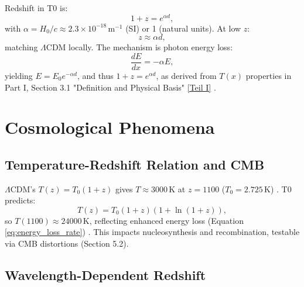 \documentclass[12pt,a4paper]{article}
\newcommand{\Tfield}{T(x)}
\begin{document}
	Redshift in T0 is:
	\begin{equation}
		1 + z = e^{\alpha d},
		\label{eq:redshift_distance}
	\end{equation}
	with \(\alpha = H_0 / c \approx 2.3 \times 10^{-18} \, \text{m}^{-1}\) (SI) or 1 (natural units). At low \(z\):
	\begin{equation}
		z \approx \alpha d,
		\label{eq:hubble_approx}
	\end{equation}
	matching \(\Lambda\)CDM locally. The mechanism is photon energy loss:
	\begin{equation}
		\frac{dE}{dx} = -\alpha E,
		\label{eq:energy_loss_rate}
	\end{equation}
	yielding \(E = E_0 e^{-\alpha d}\), and thus \(1 + z = e^{\alpha d}\), as derived from \(\Tfield\) properties in Part I, Section 3.1 "Definition and Physical Basis" \href{https://github.com/jpascher/T0-Time-Mass-Duality/tree/main/2/pdf/English/Bridging Quantum Mechanics and Relativity through Time-Mass Duality Part I Theoretical Foundations_en.pdf}{[Teil I]} \cite{pascher_messdifferenzen_2025}.
	
	\section{Cosmological Phenomena}
	\label{sec:cosmological_phenomena}
	
	\subsection{Temperature-Redshift Relation and CMB}
	\label{subsec:cmb_temp}
	
	\(\Lambda\)CDM’s \(T(z) = T_0 (1 + z)\) gives \(T \approx 3000 \, \text{K}\) at \(z = 1100\) (\(T_0 = 2.725 \, \text{K}\)) \cite{Fixsen2009}. T0 predicts:
	\begin{equation}
		T(z) = T_0 (1 + z) (1 + \ln(1 + z)),
		\label{eq:temperature_redshift_simplified}
	\end{equation}
	so \(T(1100) \approx 24000 \, \text{K}\), reflecting enhanced energy loss (Equation \ref{eq:energy_loss_rate}) \cite{pascher_temp_2025}. This impacts nucleosynthesis and recombination, testable via CMB distortions (Section 5.2).
	
	\subsection{Wavelength-Dependent Redshift}
	\label{subsec:wavelength_redshift}
	
\end{document}
